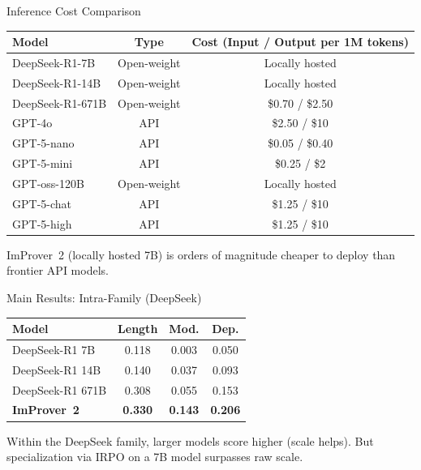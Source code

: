 \begin{frame}{Inference Cost Comparison}
\vspace{0.3em}
\begin{center}
\small
\begin{tabular}{lcc}
\toprule
\textbf{Model} & \textbf{Type} & \textbf{Cost (Input / Output per 1M tokens)}\\
\midrule
DeepSeek-R1-7B  & Open-weight & Locally hosted\\
DeepSeek-R1-14B & Open-weight & Locally hosted\\
DeepSeek-R1-671B & Open-weight & \$0.70 / \$2.50\\
GPT-4o & API & \$2.50 / \$10\\
GPT-5-nano & API & \$0.05 / \$0.40\\
GPT-5-mini & API & \$0.25 / \$2\\
GPT-oss-120B & Open-weight & Locally hosted\\
GPT-5-chat & API & \$1.25 / \$10\\
GPT-5-high & API & \$1.25 / \$10\\
\bottomrule
\end{tabular}
\end{center}
\vspace{0.4em}
\small ImProver~2 (locally hosted 7B) is orders of magnitude cheaper to deploy than frontier API models.
\end{frame}

\begin{frame}{Main Results: Intra-Family (DeepSeek)}
\vspace{0.3em}
\begin{center}
\small
\begin{tabular}{l|ccc}
\hline
\textbf{Model} & \textbf{Length} & \textbf{Mod.} & \textbf{Dep.}\\
\hline
DeepSeek-R1 7B     & 0.118 & 0.003 & 0.050\\
DeepSeek-R1 14B    & 0.140 & 0.037 & 0.093\\
DeepSeek-R1 671B   & 0.308 & 0.055 & 0.153\\
\hdashline
\textbf{ImProver~2} & \textbf{0.330} & \textbf{0.143} & \textbf{0.206}\\
\hline
\end{tabular}
\end{center}
\vspace{0.5em}
\begin{alertblock}{}
  \centering\large {}
\end{alertblock}
\vspace{0.3em}
\small Within the DeepSeek family, larger models score higher (scale helps). But specialization via IRPO on a 7B model surpasses raw scale.
\end{frame}

